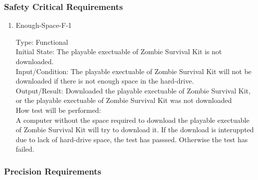 \documentclass[12pt, titlepage]{article}
\begin{document}
\subsubsection{Safety Critical Requirements}

\begin{enumerate}
	
	\item{Enough-Space-F-1\\}
	
	Type: Functional\\
	
	Initial State: The playable exectuable of Zombie Survival Kit is not downloaded.\\
	
	Input/Condition: The playable exectuable of Zombie Survival Kit will not be downloaded if there is not enough space in the hard-drive. \\
	
	Output/Result: Downloaded the playable exectuable of Zombie Survival Kit, or the playable exectuable of Zombie Survival Kit was not downloaded\\
	
	How test will be performed:\\ A computer without the space required to download the playable exectuable of Zombie Survival Kit will try to download it. If the download is interuppted due to lack of hard-drive space, the test has passsed. Otherwise the test has failed. \\
	
\end{enumerate}

\subsubsection{Precision Requirements}
\end{document}
